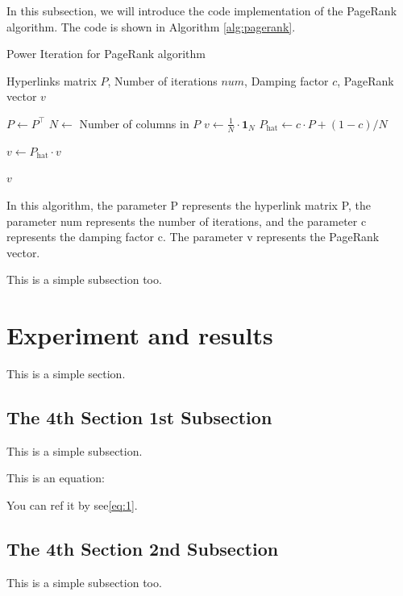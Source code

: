 \documentclass[lettersize,journal,12pt,conference]{IEEEtran}
\begin{document}
In this subsection, we will introduce the code implementation of the PageRank algorithm. The code is shown in Algorithm \ref{alg:pagerank}.

\begin{algorithm}
	\caption{Power Iteration for PageRank algorithm}
	\label{alg:pagerank}
	\begin{algorithmic}[1]
	
	\REQUIRE Hyperlinks matrix $P$, Number of iterations $num$, Damping factor $c$, PageRank vector $v$
	
	\STATE $P \gets P^\top$ 
	\STATE $N \gets$ Number of columns in $P$
	\STATE $v \gets \frac{1}{N} \cdot \mathbf{1}_N$ 
	\STATE $P_{\text{hat}} \gets c \cdot P + (1 - c) / N$ 

		\STATE $v \gets P_{\text{hat}} \cdot v$ 
	\ENDFOR
	
	\RETURN $v$
	
	\end{algorithmic}
\end{algorithm}

In this algorithm, the parameter P represents the hyperlink matrix P, the parameter num represents the number of iterations, and the parameter c represents the damping factor c. The parameter v represents the PageRank vector.

This is a simple subsection too.
\section{Experiment and results}

This is a simple section.
\subsection{The 4th Section 1st Subsection}

This is a simple subsection.

This is an equation:

You can ref it by see\eqref{eq:1}.

\subsection{The 4th Section 2nd Subsection}

This is a simple subsection too.
\end{document}
